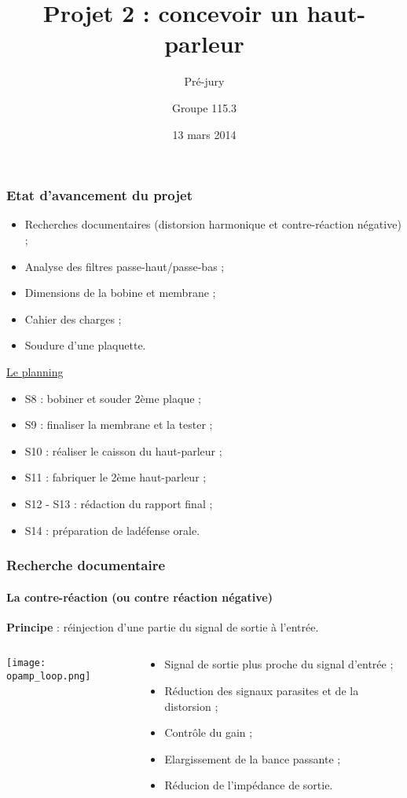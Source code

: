 \documentclass[pdf]{beamer}
\title{Projet 2 : concevoir un haut-parleur}
\subtitle{Pré-jury}
\author{Groupe 115.3}
\date{13 mars 2014}
\begin{document}
\begin{frame}
	\titlepage
\end{frame}

\begin{frame}
	\frametitle{Etat d'avancement du projet}	

	\begin{itemize}
		\item Recherches documentaires (distorsion harmonique et contre-réaction négative) ;
		\item Analyse des filtres passe-haut/passe-bas ;
		\item Dimensions de la bobine et membrane ;
		\item Cahier des charges ;
		\item Soudure d'une plaquette.
	\end{itemize}

	\underline{Le planning}
	\begin{itemize}
		\item S8 : bobiner et souder 2ème plaque ;
		\item S9 : finaliser la membrane et la tester ;
		\item S10 : réaliser le caisson du haut-parleur ;
		\item S11 : fabriquer le 2ème haut-parleur ;
		\item S12 - S13 : rédaction du rapport final ;
		\item S14 : préparation de ladéfense orale.
	\end{itemize}
\end{frame}

\begin{frame}
	\frametitle{Recherche documentaire}
	\framesubtitle{La contre-réaction (ou contre réaction négative)}
	
	\textbf{Principe} : réinjection d'une partie du signal de sortie à l'entrée.
	
	\begin{columns}
		\begin{column}{5cm}
			\texttt{[image: opamp\_loop.png]}
		\end{column}
		
		\begin{column}{5cm}
				\begin{itemize}
					\item Signal de sortie plus proche du signal d'entrée ;
					\item	Réduction des signaux parasites et de la distorsion ;
					\item Contrôle du gain ;
					\item Elargissement de la bance passante ;
					\item Réducion de l'impédance de sortie.
				\end{itemize}
		\end{column}
	\end{columns}
\end{frame}
\end{document}
